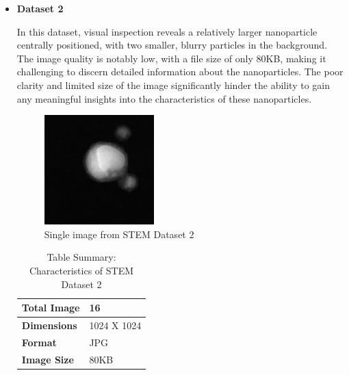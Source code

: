 \begin{itemize}
        
        \item \textbf{Dataset 2}

        In this dataset, visual inspection reveals a relatively larger nanoparticle centrally positioned, with two smaller, blurry particles in the background. The image quality is notably low, with a file size of only 80KB, making it challenging to discern detailed information about the nanoparticles. The poor clarity and limited size of the image significantly hinder the ability to gain any meaningful insights into the characteristics of these nanoparticles.

        \begin{figure}[H]
            \centering
            \includegraphics[width=0.4\textwidth]{img/Results/STEM dataset 2/Single_SD2.jpg}
            \caption{Single image from STEM Dataset 2}\label{fig:STEM Dataset 2}
        \end{figure}
        
        \begin{table}[H]
                  \centering
                  \caption{Table Summary: Characteristics of STEM Dataset 2}
                  \begin{tabularx}{.6\linewidth}{|X|X|}
                    \hline
                    \textbf{Total Image} & 16 \\
                    \hline
                    \textbf{Dimensions} & 1024 X 1024\\
                    \hline
                    \textbf{Format} & JPG \\
                    \hline
                    \textbf{Image Size} & 80KB \\
                    \hline
                  \end{tabularx}
              \end{table}
            

\end{itemize}
